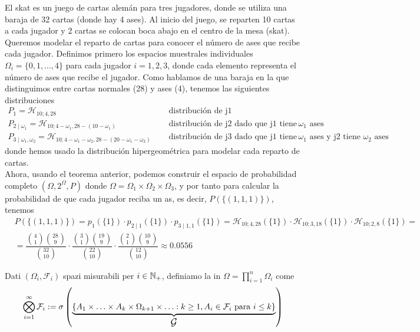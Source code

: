 \begin{ejemplo}
    El skat es un juego de cartas alemán para tres jugadores, donde se utiliza una baraja de 32 cartas (donde hay 4 ases). Al inicio del juego, se reparten 10 cartas a cada jugador y 2 cartas se colocan boca abajo en el centro de la mesa (skat). Queremos modelar el reparto de cartas para conocer el número de ases que recibe cada jugador. Definimos primero los espacios muestrales individuales $\Omega_i=\{0, 1, \ldots, 4\}$ para cada jugador $i=1,2,3$, donde cada elemento representa el número de ases que recibe el jugador. Como hablamos de una baraja en la que distinguimos entre cartas normales (28) y ases (4), tenemos las siguientes distribuciones 
    \begin{align*}
        P_1=\mathcal{H}_{10; 4, 28} \quad & \text{ distribución de j1} \\
        P_{2\mid \omega_1}=\mathcal{H}_{10; 4-\omega_1, 28-(10-\omega_1)} \quad & \text{ distribución de j2 dado que j1 tiene } \omega_1 \text{ ases} \\
        P_{3\mid \omega_1, \omega_2}=\mathcal{H}_{10; 4-\omega_1-\omega_2, 28-(20 - \omega_1 - \omega_2)} \quad & \text{ distribución de j3 dado que j1 tiene } \omega_1 \text{ ases y j2 tiene } \omega_2 \text{ ases}
    \end{align*}
    donde hemos usado la distribución hipergeométrica para modelar cada reparto de cartas. \\
    \noindent
    Ahora, usando el teorema anterior, podemos construir el espacio de probabilidad completo $(\Omega, 2^{\Omega}, P)$ donde $\Omega = \Omega_1 \times \Omega_2 \times \Omega_3$, y por tanto para calcular la probabilidad de que cada jugador reciba un as, es decir, $P(\{(1,1,1)\})$, tenemos
    \begin{align*}
        & P(\{(1,1,1)\}) = p_1(\{1\}) \cdot p_{2\mid 1}(\{1\}) \cdot p_{3\mid 1,1}(\{1\})= \mathcal{H}_{10; 4, 28}(\{1\}) \cdot \mathcal{H}_{10; 3, 18}(\{1\}) \cdot \mathcal{H}_{10; 2, 8}(\{1\})= \\
        & = \dfrac{\binom{4}{1} \binom{28}{9}}{\binom{32}{10}} \cdot \dfrac{\binom{3}{1} \binom{19}{9}}{\binom{22}{10}} \cdot \dfrac{\binom{2}{1} \binom{10}{9}}{\binom{12}{10}} \approx 0.0556
    \end{align*}
\end{ejemplo}
\begin{definicion}
    Dati $(\Omega_i, \mathcal{F}_i)$ spazi misurabili per $i\in \mathbb{N}_+$, definiamo la  in $\Omega = \prod\limits_{i=1}^n \Omega_i$ come
    \begin{equation*}
        \bigotimes_{i=1}^{\infty}\mathcal{F}_i := \sigma\left( \underbrace{\left\{ A_1 \times \ldots \times A_k \times \Omega_{k+1} \times \ldots : k\geq 1, A_i \in \mathcal{F}_i \text{ para } i\leq k \right\}}_{\text{\large $\mathcal{G}$}} \right)
    \end{equation*}
\end{definicion}


